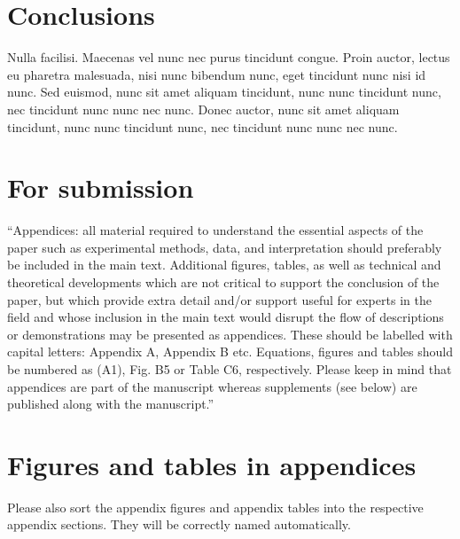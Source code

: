 \documentclass[soil, manuscript]{copernicus}
\begin{document}
\section{Conclusions}

Nulla facilisi.
Maecenas vel nunc nec purus tincidunt congue.
Proin auctor, lectus eu pharetra malesuada,
nisi nunc bibendum nunc,
eget tincidunt nunc nisi id nunc.
Sed euismod, nunc sit amet aliquam tincidunt,
nunc nunc tincidunt nunc,
nec tincidunt nunc nunc nec nunc.
Donec auctor, nunc sit amet aliquam tincidunt,
nunc nunc tincidunt nunc,
nec tincidunt nunc nunc nec nunc.







\appendix
\section{For submission}

``Appendices: all material required to understand the essential aspects of the paper
such as experimental methods, data, and interpretation
should preferably be included in the main text.
Additional figures, tables, as well as technical and theoretical developments
which are not critical to support the conclusion of the paper,
but which provide extra detail and/or support useful for experts in the field
and whose inclusion in the main text would disrupt the flow of descriptions or demonstrations
may be presented as appendices.
These should be labelled with capital letters: Appendix A, Appendix B etc.
Equations, figures and tables should be numbered as (A1), Fig. B5 or Table C6, respectively.
Please keep in mind that appendices are part of the manuscript
whereas supplements (see below) are published along with the manuscript.''

\section{Figures and tables in appendices}

Please also sort the appendix figures and appendix tables into the respective appendix sections.
They will be correctly named automatically.
\end{document}

